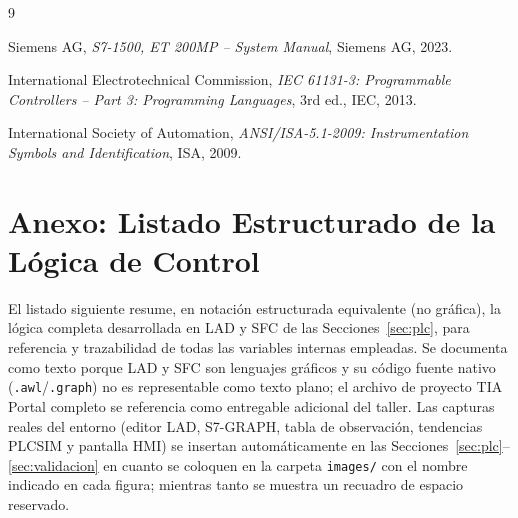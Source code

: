 \documentclass[conference]{IEEEtran}
\begin{document}

\begin{thebibliography}{9}

Siemens AG, \textit{S7-1500, ET 200MP -- System Manual}, Siemens AG, 2023.

International Electrotechnical Commission, \textit{IEC 61131-3: Programmable Controllers -- Part 3: Programming Languages}, 3rd ed., IEC, 2013.

International Society of Automation, \textit{ANSI/ISA-5.1-2009: Instrumentation Symbols and Identification}, ISA, 2009.

\end{thebibliography}

\section*{Anexo: Listado Estructurado de la Lógica de Control}

El listado siguiente resume, en notación estructurada equivalente (no gráfica), la lógica completa desarrollada en LAD y SFC de las Secciones~\ref{sec:plc}, para referencia y trazabilidad de todas las variables internas empleadas. Se documenta como texto porque LAD y SFC son lenguajes gráficos y su código fuente nativo (\texttt{.awl}/\texttt{.graph}) no es representable como texto plano; el archivo de proyecto TIA Portal completo se referencia como entregable adicional del taller. Las capturas reales del entorno (editor LAD, S7-GRAPH, tabla de observación, tendencias PLCSIM y pantalla HMI) se insertan automáticamente en las Secciones~\ref{sec:plc}--\ref{sec:validacion} en cuanto se coloquen en la carpeta \texttt{images/} con el nombre indicado en cada figura; mientras tanto se muestra un recuadro de espacio reservado.
\end{document}
